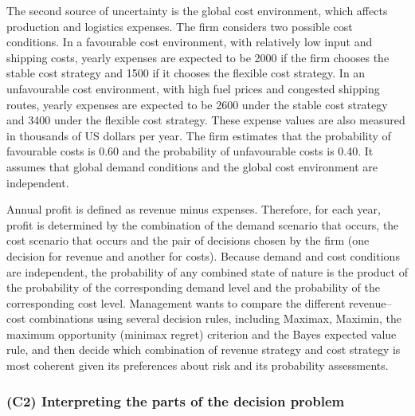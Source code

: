 \medskip
The second source of uncertainty is the global cost environment, which affects production and logistics expenses. The firm
considers two possible cost conditions. In a favourable cost environment, with relatively low input and shipping costs,
yearly expenses are expected to be 2000 if the firm chooses the stable cost strategy and 1500 if it chooses the flexible
cost strategy. In an unfavourable cost environment, with high fuel prices and congested shipping routes, yearly expenses
are expected to be 2600 under the stable cost strategy and 3400 under the flexible cost strategy. These expense values are
also measured in thousands of US dollars per year. The firm estimates that the probability of favourable costs is 0.60 and
the probability of unfavourable costs is 0.40. It assumes that global demand conditions and the global cost environment are
independent.

\medskip
Annual profit is defined as revenue minus expenses. Therefore, for each year, profit is determined by the combination of
the demand scenario that occurs, the cost scenario that occurs and the pair of decisions chosen by the firm (one decision
for revenue and another for costs). Because demand and cost conditions are independent, the probability of any combined
state of nature is the product of the probability of the corresponding demand level and the probability of the
corresponding cost level. Management wants to compare the different revenue--cost combinations using several decision
rules, including Maximax, Maximin, the maximum opportunity (minimax regret) criterion and the Bayes expected value rule,
and then decide which combination of revenue strategy and cost strategy is most coherent given its preferences about risk
and its probability assessments.


\subsubsection{(C2) Interpreting the parts of the decision problem}\label{subsubsec:example3-c2}

